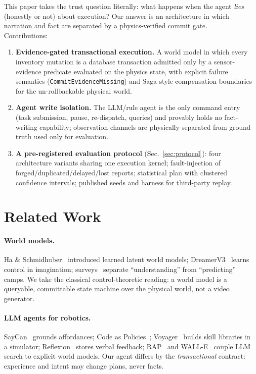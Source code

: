 \documentclass[11pt]{article}
\begin{document}
This paper takes the trust question literally: what happens when the agent
\emph{lies} (honestly or not) about execution? Our answer is an architecture in
which narration and fact are separated by a physics-verified commit gate.
Contributions:
\begin{enumerate}[label=C\arabic*.]
\item \textbf{Evidence-gated transactional execution.} A world model in which
every inventory mutation is a database transaction admitted only by a
sensor-evidence predicate evaluated on the physics state, with explicit
failure semantics (\texttt{CommitEvidenceMissing}) and Saga-style compensation
boundaries for the un-rollbackable physical world.
\item \textbf{Agent write isolation.} The LLM/rule agent is the only command
entry (task submission, pause, re-dispatch, queries) and provably holds no
fact-writing capability; observation channels are physically separated from
ground truth used only for evaluation.
\item \textbf{A pre-registered evaluation protocol} (Sec.~\ref{sec:protocol}):
four architecture variants sharing one execution kernel; fault-injection of
forged/duplicated/delayed/lost reports; statistical plan with clustered
confidence intervals; published seeds and harness for third-party replay.
\end{enumerate}

\section{Related Work}\label{sec:related}
\paragraph{World models.}
Ha \& Schmidhuber~\cite{ha2018world} introduced learned latent world models;
DreamerV3~\cite{hafner2023dreamerv3} learns control in imagination;
surveys~\cite{wu2024understanding} separate ``understanding'' from ``predicting''
camps. We take the classical control-theoretic reading: a world model is a
queryable, committable state machine over the physical world, not a video
generator.
\paragraph{LLM agents for robotics.}
SayCan~\cite{ahn2022saycan} grounds affordances; Code as Policies~\cite{liang2022cap};
Voyager~\cite{wang2023voyager} builds skill libraries in a simulator;
Reflexion~\cite{shinn2023reflexion} stores verbal feedback;
RAP~\cite{hao2023rap} and WALL-E~\cite{zhang2024walle} couple LLM search to
explicit world models. Our agent differs by the \emph{transactional} contract:
experience and intent may change plans, never facts.
\end{document}
